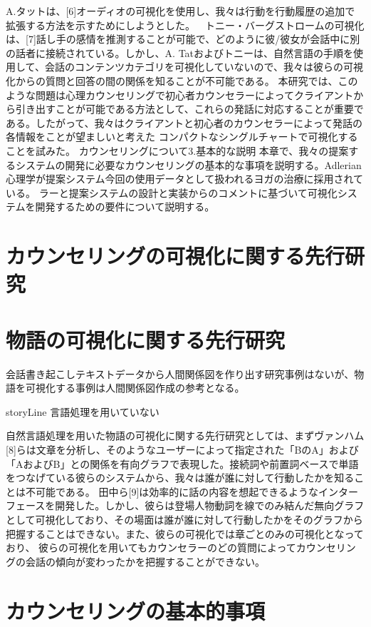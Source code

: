 \documentclass[shuuron]{kuee}
\begin{document}
 A.タットは、[6]オーディオの可視化を使用し、我々は行動を行動履歴の追加で拡張する方法を示すためにしようとした。
  トニー・バーグストロームの可視化は、[7]話し手の感情を推測することが可能で、どのように彼/彼女が会話中に別の話者に接続されている。しかし、A. Tatおよびトニーは、自然言語の手順を使用して、会話のコンテンツカテゴリを可視化していないので、我々は彼らの可視化からの質問と回答の間の関係を知ることが不可能である。
 本研究では、このような問題は心理カウンセリングで初心者カウンセラーによってクライアントから引き出すことが可能である方法として、これらの発話に対応することが重要である。したがって、我々はクライアントと初心者のカウンセラーによって発話の各情報をことが望ましいと考えた コンパクトなシングルチャートで可視化することを試みた。
 カウンセリングについて3.基本的な説明
 本章で、我々の提案するシステムの開発に必要なカウンセリングの基本的な事項を説明する。Adlerian心理学が提案システム今回の使用データとして扱われるヨガの治療に採用されている。
ラーと提案システムの設計と実装からのコメントに基づいて可視化システムを開発するための要件について説明する。

\section{カウンセリングの可視化に関する先行研究}

\section{物語の可視化に関する先行研究}

会話書き起こしテキストデータから人間関係図を作り出す研究事例はないが、物語を可視化する事例は人間関係図作成の参考となる。

storyLine
言語処理を用いていない

自然言語処理を用いた物語の可視化に関する先行研究としては、まずヴァンハム[8]らは文章を分析し、そのようなユーザーによって指定された「BのA」および「AおよびB」との関係を有向グラフで表現した。接続詞や前置詞ベースで単語をつなげている彼らのシステムから、我々は誰が誰に対して行動したかを知ることは不可能である。
田中ら[9]は効率的に話の内容を想起できるようなインターフェースを開発した。しかし、彼らは登場人物動詞を線でのみ結んだ無向グラフとして可視化しており、その場面は誰が誰に対して行動したかをそのグラフから把握することはできない。また、彼らの可視化では章ごとのみの可視化となっており、 彼らの可視化を用いてもカウンセラーのどの質問によってカウンセリングの会話の傾向が変わったかを把握することができない。



\section{カウンセリングの基本的事項}
\end{document}
